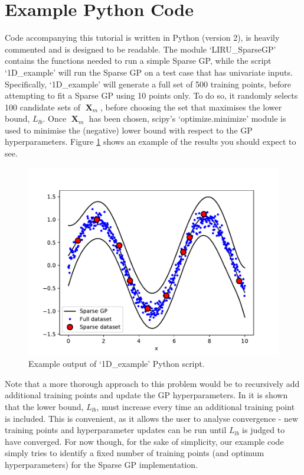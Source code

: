 \documentclass[a4paper, 11pt]{article}
\DeclareMathOperator{\X}{\boldsymbol{X}}
\begin{document}
\section{Example Python Code}\label{sec:code}
Code accompanying this tutorial is written in Python (version 2), is heavily commented and is designed to be readable. The module `LIRU\_SparseGP' contains the functions needed to run a simple Sparse GP, while the script `1D\_example' will run the Sparse GP on a test case that has univariate inputs. Specifically, `1D\_example' will generate a full set of 500 training points, before attempting to fit a Sparse GP using 10 points only. To do so, it randomly selects 100 candidate sets of $\X_m$, before choosing the set that maximises the lower bound, $L_{lb}$. Once $\X_m$ has been chosen, scipy's `optimize.minimize' module is used to minimise the (negative) lower bound with respect to the GP hyperparameters. Figure \ref{fig:example_results} shows an example of the results you should expect to see. \\

\begin{figure}[H]
	\centering
	\includegraphics[scale=0.7]{1D_example_results.pdf}
	\caption{Example output of `1D\_example' Python script.}
	\label{fig:example_results}
\end{figure}

Note that a more thorough approach to this problem would be to recursively add additional training points and update the GP hyperparameters. In  \cite{Titsias2009}\cite{Titsias2009a} it is shown that the lower bound, $L_{lb}$, must increase every time an additional training point is included. This is convenient, as it allows the user to analyse convergence - new training points and hyperparameter updates can be run until $L_{lb}$ is judged to have converged. For now though, for the sake of simplicity, our example code simply tries to identify a fixed number of training points (and optimum hyperparameters) for the Sparse GP implementation. \\
\end{document}
